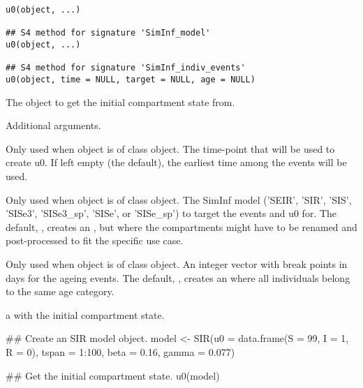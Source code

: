 \documentclass[letterpaper]{book}
\begin{document}
%
\begin{Usage}
\begin{verbatim}
u0(object, ...)

## S4 method for signature 'SimInf_model'
u0(object, ...)

## S4 method for signature 'SimInf_indiv_events'
u0(object, time = NULL, target = NULL, age = NULL)
\end{verbatim}
\end{Usage}
%
\begin{Arguments}
\begin{ldescription}
\item[\code{object}] The object to get the initial compartment state
 from.

\item[\code{...}] Additional arguments.

\item[\code{time}] Only used when object is of class
 object. The time-point that will be
used to create u0. If left empty (the default), the earliest
time among the events will be used.

\item[\code{target}] Only used when object is of class
 object. The SimInf model ('SEIR',
'SIR', 'SIS', 'SISe3', 'SISe3\_sp', 'SISe', or 'SISe\_sp') to
target the events and u0 for. The default, ,
creates an , but where the compartments might have to
be renamed and post-processed to fit the specific use case.

\item[\code{age}] Only used when object is of class
 object. An integer vector with
break points in days for the ageing events. The default,
, creates an  where all individuals belong
to the same age category.
\end{ldescription}
\end{Arguments}
%
\begin{Value}
a  with the initial compartment state.
\end{Value}
%
\begin{Examples}
\begin{ExampleCode}
## Create an SIR model object.
model <- SIR(u0 = data.frame(S = 99, I = 1, R = 0),
             tspan = 1:100,
             beta = 0.16,
             gamma = 0.077)

## Get the initial compartment state.
u0(model)
\end{ExampleCode}
\end{Examples}
\end{document}

